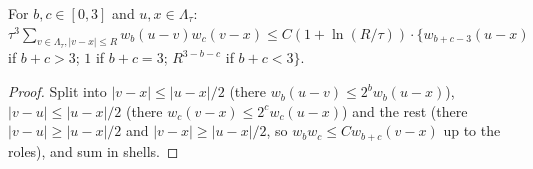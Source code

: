 \begin{lemma}\label{app:a04:lem:Tp}
For $b,c\in[0,3]$ and $u,x\in\Lambda_\tau$: $\tau^3\sum_{v\in\Lambda_\tau,|v-x|\le R}w_b(u-v)w_c(v-x)\le C(1+\ln(R/\tau))\cdot\{w_{b+c-3}(u-x)$ if $b+c>3$; $1$ if $b+c=3$; $R^{3-b-c}$ if $b+c<3\}$.
\end{lemma}
\begin{proof}
Split into $|v-x|\le|u-x|/2$ (there $w_b(u-v)\le2^bw_b(u-x)$), $|v-u|\le|u-x|/2$ (there $w_c(v-x)\le2^cw_c(u-x)$) and the rest (there $|v-u|\ge|u-x|/2$ and $|v-x|\ge|u-x|/2$, so $w_bw_c\le Cw_{b+c}(v-x)$ up to the roles), and sum in shells.
\end{proof}
